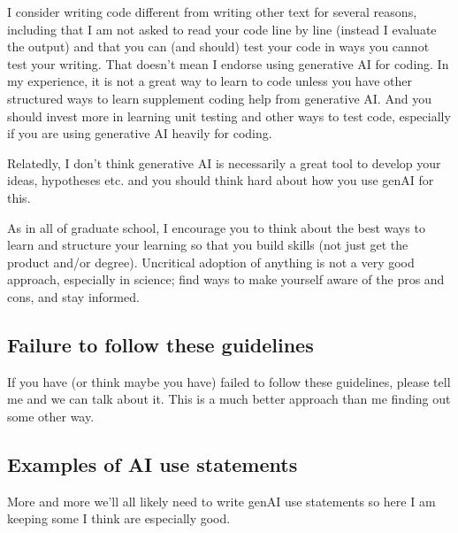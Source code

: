 \documentclass[11pt]{article}
\begin{document}
I consider writing code different from writing other text for several reasons, including that I am not asked to read your code line by line (instead I evaluate the output) and that you can (and should) test your code in ways you cannot test your writing. That doesn't mean I endorse using generative AI for coding. In my experience, it is not a great way to learn to code unless you have other structured ways to learn supplement coding help from generative AI. And you should invest more in learning unit testing and other ways to test code, especially if you are using generative AI heavily for coding. 

Relatedly, I don't think generative AI is necessarily a great tool to develop your ideas, hypotheses etc. and you should think hard about how you use genAI for this. 

As in all of graduate school, I encourage you to think about the best ways to learn and structure your learning so that you build skills (not just get the product and/or degree). Uncritical adoption of anything is not a very good approach, especially in science; find ways to make yourself aware of the pros and cons, and stay informed. 


\subsection*{Failure to follow these guidelines}
If you have (or think maybe you have) failed to follow these guidelines, please tell me and we can talk about it. This is a much better approach than me finding out some other way. %


\subsection*{Examples of AI use statements} 
More and more we'll all likely need to write genAI use statements so here I am keeping some I think are especially good. 
\end{document}
